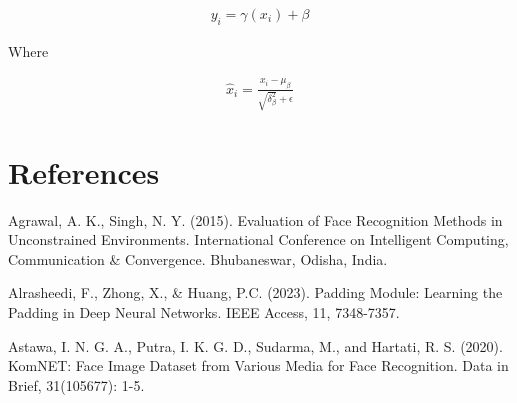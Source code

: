 \documentclass[
  12pt,
]{report}
\begin{document}
\vspace{-1em}

\begin{equation}
\begin{aligned}
y_i = \gamma(x_i) + \beta
\label{eq:equation 3.39}
\end{aligned}
\end{equation} \vspace{-1em}

Where

\vspace{-1em}

\begin{equation}
\begin{aligned}
\hat{x}_i = \frac{x_i - \mu_{\beta}}{\sqrt{\delta_{\beta}^2} + \epsilon}
\label{eq:equation 3.40}
\end{aligned}
\end{equation} \vspace{-1em}

\newpage

\titleformat{\section}[block]{\normalfont\bfseries}{\thesection}{1em}{}
\titlespacing*{\section}{0pt}{0pt}{0pt}

\chapter*{References}\label{references}

\vspace{-3em}

Agrawal, A. K., Singh, N. Y. (2015). Evaluation of Face Recognition
Methods in \hangindent=40pt Unconstrained Environments. International
Conference on Intelligent Computing, Communication \& Convergence.
Bhubaneswar, Odisha, India.

Alrasheedi, F., Zhong, X., \& Huang, P.C. (2023). Padding Module:
Learning the \hangindent=40pt Padding in Deep Neural Networks. IEEE
Access, 11, 7348-7357.

Astawa, I. N. G. A., Putra, I. K. G. D., Sudarma, M., and Hartati, R. S.
(2020). KomNET: \hangindent=40pt Face Image Dataset from Various Media
for Face Recognition. Data in Brief, 31(105677): 1-5.
\end{document}
